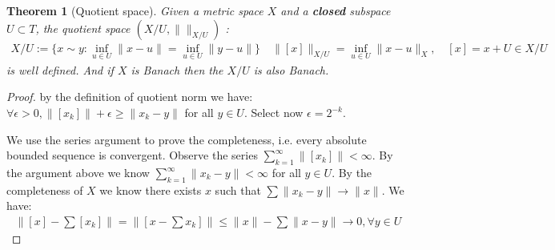 \documentclass[a4paper,11pt,fleqn]{book}
\newtheorem{theorem}{Theorem}[section]
\theoremstyle{definition}
\theoremstyle{remark}
\begin{document}
\begin{theorem}[Quotient space]
	Given a metric space $X$ and a \textbf{closed} subspace $U \subset T$, the quotient space $(X\slash U, \|\|_{X\slash U})$ :
	\begin{align*}
		X\slash U:= \{ x \sim y : \inf_{u \in U} \|x - u\| = \inf_{u \in U} \|y - u\| \}\quad 
		\|[x]\|_{X\slash U } = \inf_{u \in U}\|x - u\|_X, \quad
		[x] = x + U \in X\slash U
	\end{align*}
	is well defined. And if $X$ is Banach then the $X\slash U$ is also Banach.
\end{theorem}
\begin{proof}
	by the definition of quotient norm we have: $\forall \epsilon >0, \|[x_k]\| + \epsilon  \ge \|x_k - y\|$ for all $y \in U$. Select now $\epsilon = 2^{-k}$.\par 
	We use the series argument to prove the completeness, i.e. every absolute bounded sequence is convergent. Observe the series $\sum_{k = 1}^\infty \|[x_k]\| < \infty$. By the argument above we know $\sum_{k = 1}^\infty \|x_k - y\| < \infty$ for all $y \in U$. By the completeness of $X$ we know there exists $x$ such that $ \sum \|x_k - y\| \rightarrow \|x\|$. We have:
	\begin{align*}
		\|[x] - \sum [x_k]\| = \|[x - \sum x_k]\| \le \|x\| -  \sum\|x - y\| \rightarrow 0, \forall y \in U
	\end{align*}
\end{proof}
\end{document}
